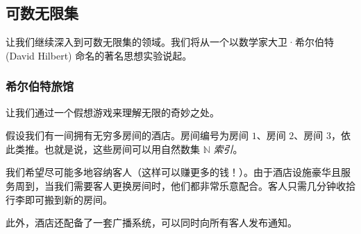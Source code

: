 
\subsection{可数无限集}\label{sec:section7.6.3}

让我们继续深入到可数无限集的领域。我们将从一个以数学家大卫·希尔伯特 (David Hilbert) 命名的著名思想实验说起。

\subsubsection*{希尔伯特旅馆}

让我们通过一个假想游戏来理解无限的奇妙之处。

假设我们有一间拥有无穷多房间的酒店。房间编号为房间 $1$、房间 $2$、房间 $3$，依此类推。也就是说，这些房间可以用自然数集 $\mathbb{N}$ \emph{索引}。

我们希望尽可能多地容纳客人（这样可以赚更多的钱！）。由于酒店设施豪华且服务周到，当我们需要客人更换房间时，他们都非常乐意配合。客人只需几分钟收拾行李即可搬到新的房间。

此外，酒店还配备了一套广播系统，可以同时向所有客人发布通知。

